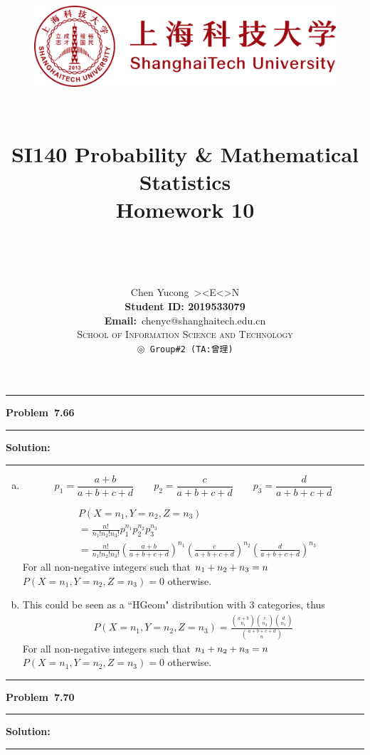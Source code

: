 \documentclass[10.5pt]{article}
\title{
	\normalfont \normalsize
	\begin{figure}[!h]
	\centering
	\includegraphics[width=4.8in, keepaspectratio]{logo_red.pdf}\\[1cm]
	\end{figure}
	\horrule{0.5pt} \\[0.4cm]
	\Huge SI140 Probability \& Mathematical Statistics\\[0.4cm]
	\LARGE Homework 10\\
	\horrule{2pt} \\[1.5cm]
}
\author{\Song{\huge\textbf{陈昱聪}}\\[0.2cm]Chen Yucong\ ><E<>N\\[4.5cm]\textbf{Student ID: 2019533079}\\[0.2cm] 
\textbf{Email:}\ {\ttfamily chenyc@shanghaitech.edu.cn}\\[0.8cm] \LARGE\textsc{School of Information Science and Technology}\\[0.63cm]
\texttt{$\circledcirc$ Group\#2\ (TA:曾理)}}
\date{}
\newcommand\question[1]{\vspace{.2in}\hrule\vspace{0.04in}\textbf{Problem\ #1}\vspace{.4em}\hrule\vspace{.10in}}
\newcommand\Solution{\vspace{.3in}\textbf{Solution:}\vspace{.5em}\hrule\vspace{.08in}\par}
\begin{document}
	
\maketitle
\thispagestyle{firstpage}
\thispagestyle{empty}
\setcounter{page}{0}



\question{7.66}
\Solution{}
\begin{enumerate}[(a)]
	\item $$p_1=\frac{a+b}{a+b+c+d}\qquad p_2 = \frac{c}{a+b+c+d}\qquad p_3 = \frac{d}{a+b+c+d}$$
	
	\begin{align*}
		&P(X=n_1,Y=n_2,Z=n_3)\\[8pt]
		&= \frac{n!}{n_1!n_2!n_3!}p_1^{n_1}p_2^{n_2}p_3^{n_3}\\[8pt]
		&=\frac{n!}{n_1!n_2!n_3!}\left(\frac{a+b}{a+b+c+d}\right)^{n_1}\left(\frac{c}{a+b+c+d}\right)^{n_2}\left(\frac{d}{a+b+c+d}\right)^{n_3}
	\end{align*}
For all non-negative integers such that $n_1+n_2+n_3 = n\\$ $P(X=n_1,Y=n_2,Z=n_3)=0$ otherwise.\vspace{0.5cm}
	\item This could be seen as a ``HGeom" distribution with $3$ categories, thus
	\begin{align*}
		P(X=n_1,Y=n_2,Z=n_3) = \frac{\binom{a+b}{n_1}\binom{c}{n_2}\binom{d}{n_3}}{\binom{a+b+c+d}{n}}
	\end{align*}
	For all non-negative integers such that $n_1+n_2+n_3 = n\\$ $P(X=n_1,Y=n_2,Z=n_3)=0$ otherwise.
\end{enumerate}
\pagebreak
\question{7.70}
\Solution{}
\end{document}
